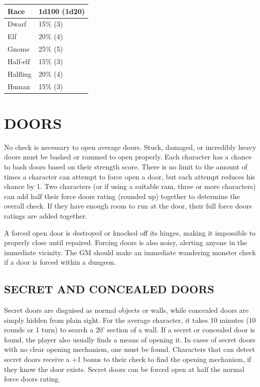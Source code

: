 \begin{multicols}{2}
\noindent
\begin{minipage}{\columnwidth}

\label{hearingbyrace}
\noindent
\begin{tabular}{|p{}|p{}|}
\hline
Race		& 1d100 (1d20) \\
\hline\hline
\rowcolor[gray]{.9}Dwarf		& 15\% (3) \\
Elf			& 20\% (4) \\
\rowcolor[gray]{.9}Gnome		& 25\% (5) \\
Half-elf	& 15\% (3) \\
\rowcolor[gray]{.9}Halfling	& 20\% (4) \\
Human		& 15\% (3) \\
\hline
\end{tabular}

\end{minipage}

\section{DOORS}

No check is necessary to open average doors.  Stuck, damaged, or incredibly heavy doors must be bashed or rammed to open properly.  Each character has a chance to bash doors based on their strength score.  There is no limit to the amount of times a character can attempt to force open a door, but each attempt reduces his chance by 1.  Two characters (or if using a suitable ram, three or more characters) can add half their force doors rating (rounded up) together to determine the overall check.  If they have enough room to run at the door, their full force doors ratings are added together.

A forced open door is destroyed or knocked off its hinges, making it impossible to properly close until repaired.  Forcing doors is also noisy, alerting anyone in the immediate vicinity.  The GM should make an immediate wandering monster check if a door is forced within a dungeon.

 
\subsection{SECRET AND CONCEALED DOORS}

Secret doors are disguised as normal objects or walls, while concealed doors are simply hidden from plain sight.  For the average character, it takes 10 minutes (10 rounds or 1 turn) to search a 20' section of a wall.  If a secret or concealed door is found, the player also usually finds a means of opening it.  In cases of secret doors with no clear opening mechanism, one must be found.  Characters that can detect secret doors receive a +1 bonus to their check to find the opening mechanism, if they know the door exists.  Secret doors can be forced open at half the normal force doors rating.  


\end{multicols}
